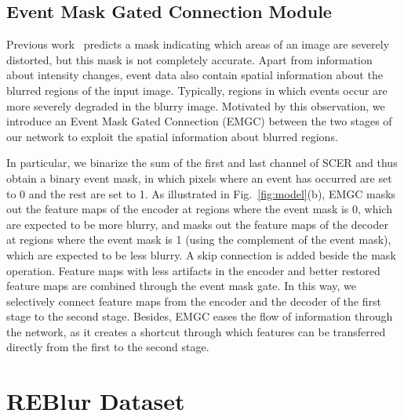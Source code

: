 \documentclass[runningheads]{llncs}
\newlength \g
\begin{document}
\subsection{Event Mask Gated Connection Module}
\label{sec:method:emgc}

Previous work~\cite{purohit2021spatially} predicts a mask indicating which areas of an image are severely distorted, but this mask is not completely accurate. Apart from information about intensity changes, event data also contain spatial information about the blurred regions of the input image. Typically, regions in which events occur are more severely degraded in the blurry image. Motivated by this observation, we introduce an Event Mask Gated Connection (EMGC) between the two stages of our network to exploit the spatial information about blurred regions.

In particular, we binarize the sum of the first and last channel of SCER and thus obtain a binary event mask, in which pixels where an event has occurred are set to 0 and the rest are set to 1. As illustrated in Fig.~\ref{fig:model}(b), EMGC masks out the feature maps of the encoder at regions where the event mask is 0, which are expected to be more blurry, and masks out the feature maps of the decoder at regions where the event mask is 1 (using the complement of the event mask), which are expected to be less blurry. A skip connection is added beside the mask operation. Feature maps with less artifacts in the encoder and better restored feature maps are combined through the event mask gate.
In this way, we selectively connect feature maps from the encoder and the decoder of the first stage to the second stage. Besides, EMGC eases the flow of information through the network, as it creates a shortcut through which features can be transferred directly from the first to the second stage.


\section{REBlur Dataset}
\label{sec:reblur_dataset}
\end{document}
